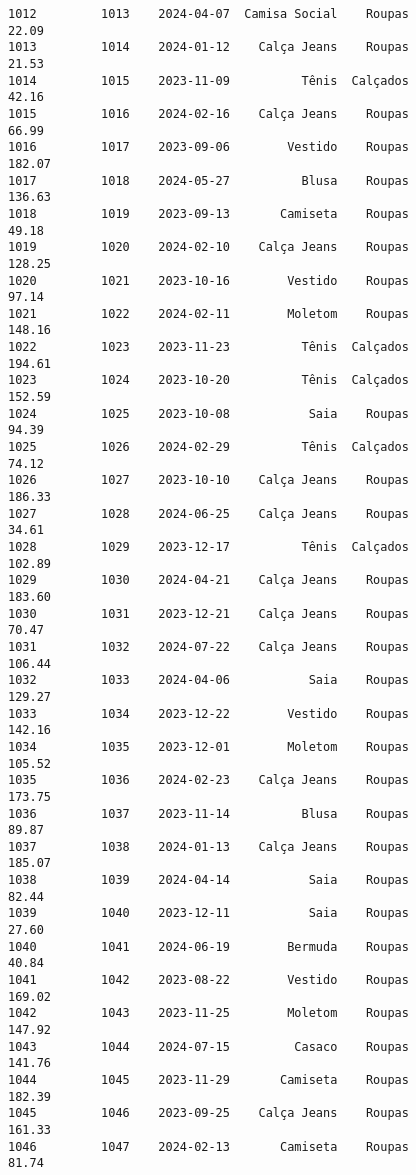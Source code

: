 \documentclass[11pt]{article}
\begin{document}
\begin{Verbatim}[commandchars=\\\{\}]
1012         1013    2024-04-07  Camisa Social    Roupas           22.09   
1013         1014    2024-01-12    Calça Jeans    Roupas           21.53   
1014         1015    2023-11-09          Tênis  Calçados           42.16   
1015         1016    2024-02-16    Calça Jeans    Roupas           66.99   
1016         1017    2023-09-06        Vestido    Roupas          182.07   
1017         1018    2024-05-27          Blusa    Roupas          136.63   
1018         1019    2023-09-13       Camiseta    Roupas           49.18   
1019         1020    2024-02-10    Calça Jeans    Roupas          128.25   
1020         1021    2023-10-16        Vestido    Roupas           97.14   
1021         1022    2024-02-11        Moletom    Roupas          148.16   
1022         1023    2023-11-23          Tênis  Calçados          194.61   
1023         1024    2023-10-20          Tênis  Calçados          152.59   
1024         1025    2023-10-08           Saia    Roupas           94.39   
1025         1026    2024-02-29          Tênis  Calçados           74.12   
1026         1027    2023-10-10    Calça Jeans    Roupas          186.33   
1027         1028    2024-06-25    Calça Jeans    Roupas           34.61   
1028         1029    2023-12-17          Tênis  Calçados          102.89   
1029         1030    2024-04-21    Calça Jeans    Roupas          183.60   
1030         1031    2023-12-21    Calça Jeans    Roupas           70.47   
1031         1032    2024-07-22    Calça Jeans    Roupas          106.44   
1032         1033    2024-04-06           Saia    Roupas          129.27   
1033         1034    2023-12-22        Vestido    Roupas          142.16   
1034         1035    2023-12-01        Moletom    Roupas          105.52   
1035         1036    2024-02-23    Calça Jeans    Roupas          173.75   
1036         1037    2023-11-14          Blusa    Roupas           89.87   
1037         1038    2024-01-13    Calça Jeans    Roupas          185.07   
1038         1039    2024-04-14           Saia    Roupas           82.44   
1039         1040    2023-12-11           Saia    Roupas           27.60   
1040         1041    2024-06-19        Bermuda    Roupas           40.84   
1041         1042    2023-08-22        Vestido    Roupas          169.02   
1042         1043    2023-11-25        Moletom    Roupas          147.92   
1043         1044    2024-07-15         Casaco    Roupas          141.76   
1044         1045    2023-11-29       Camiseta    Roupas          182.39   
1045         1046    2023-09-25    Calça Jeans    Roupas          161.33   
1046         1047    2024-02-13       Camiseta    Roupas           81.74   

\end{Verbatim}
\end{document}
